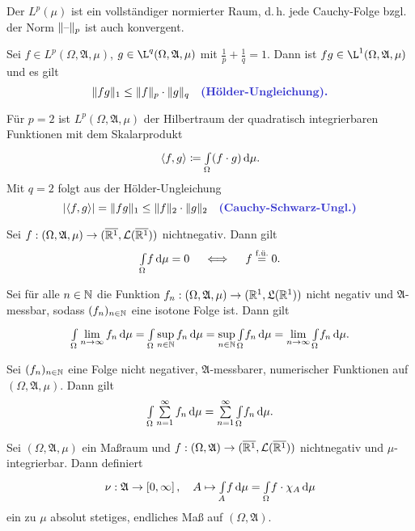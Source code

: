 \documentclass{cheat-sheet}
\newcommand{\Alg}{\mathfrak{A}} %
\newcommand{\LebAlg}{\mathfrak{L}} %
\newcommand{\Leb}{\mathcal{L}} %
\renewcommand{\ER}{\overline{\R^1}} %
\newcommand{\fue}{\overset{\text{f.ü.}}} %
\newcommand{\IntOmu}[1]{\Int{\Omega}{}{#1}{\mu}} %
\begin{document}
\begin{satz}
  Der $L^p(\mu)$ ist ein vollständiger normierter Raum, d.\,h. jede Cauchy-Folge bzgl. der Norm $\lVert\text{--}\rVert_p$ ist auch konvergent.
\end{satz}

\begin{satz}
  Sei $f \in L^p(\Omega, \Alg, \mu)$, $g \in \L^q(\Omega, \Alg, \mu)$ mit $\tfrac{1}{p} + \tfrac{1}{q} = 1$. Dann ist $fg \in \L^1(\Omega, \Alg, \mu)$ und es gilt
  \[ \norm{fg}_1 \leq \norm{f}_p \cdot \norm{g}_q \quad \text{\emph{(Hölder-Ungleichung).}} \]
\end{satz}

\begin{bem}
  Für $p = 2$ ist $L^p(\Omega, \Alg, \mu)$ der Hilbertraum der quadratisch integrierbaren Funktionen mit dem Skalarprodukt
  \[ \langle f , g \rangle \coloneqq \IntOmu{(f \cdot g)}. \]
  Mit $q = 2$ folgt aus der Hölder-Ungleichung
  \[ \abs{\langle f , g \rangle} = \norm{fg}_1 \leq \norm{f}_2 \cdot \norm{g}_2 \quad \text{\emph{(Cauchy-Schwarz-Ungl.)}} \]
\end{bem}

\begin{satz}
  Sei $f : (\Omega, \Alg, \mu) \to (\ER, \mathcal{L}(\ER))$ nichtnegativ. Dann gilt
  \[ \IntOmu{f} = 0 \quad \iff \quad f \fue{=} 0. \]
\end{satz}



\begin{satz}
  Sei für alle $n \in \mathbb{N}$ die Funktion $f_n : (\Omega, \Alg, \mu) \to (\R^1, \LebAlg(\R^1))$ nicht negativ und $\Alg$-messbar, sodass $(f_n)_{n \in \mathbb{N}}$ eine isotone Folge ist. Dann gilt
  \[ \IntOmu{\lim_{n \to \infty} f_n} = \IntOmu{\sup_{n \in \N} f_n} = \sup_{n \in \N} \IntOmu{f_n} = \lim_{n \to \infty} \IntOmu{f_n}. \]
\end{satz}

\begin{kor}
  Sei $(f_n)_{n \in \mathbb{N}}$ eine Folge nicht negativer, $\Alg$-messbarer, numerischer Funktionen auf $(\Omega, \Alg, \mu)$. Dann gilt
  \[ \IntOmu{\sum_{n=1}^{\infty} f_n} = \sum_{n=1}^\infty \IntOmu{f_n}. \]
\end{kor}

\begin{satz}
  Sei $(\Omega, \Alg, \mu)$ ein Maßraum und $f : (\Omega, \Alg) \to (\ER, \Leb(\ER))$ nichtnegativ und $\mu$-integrierbar. Dann definiert
  \[ \nu : \Alg \to \cinterval{0}{\infty}, \quad A \mapsto \Int{A}{}{f}{\mu} = \IntOmu{f \cdot \chi_A} \]
  ein zu $\mu$ absolut stetiges, endliches Maß auf $(\Omega, \Alg)$.
\end{satz}
\end{document}
